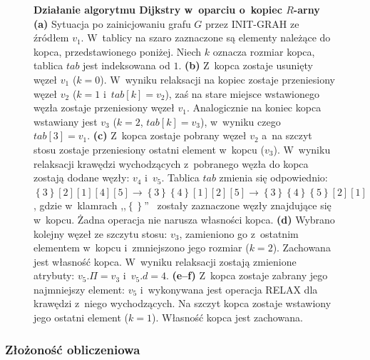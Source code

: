 \begin{figure}[!htbp]
\begin{subfigure}[b]{0.33\textwidth}
		\caption{}
	\end{subfigure}
	\caption{\textbf{Działanie algorytmu Dijkstry w~oparciu o~kopiec $R$-arny} \textbf{(a)} Sytuacja po zainicjowaniu grafu $G$ przez \textsf{INIT-GRAH} ze źródłem $v_{1}$. W~tablicy na szaro zaznaczone są elementy należące do kopca, przedstawionego poniżej. Niech $k$ oznacza rozmiar kopca, tablica $tab$ jest indeksowana od $1$. \textbf{(b)} Z~kopca zostaje usunięty węzeł $v_{1}$ ($k=0$). W~wyniku relaksacji na kopiec zostaje przeniesiony węzeł $v_{2}$ ($k=1$ i~$tab \left[ k \right] = v_{2}$), zaś na stare miejsce wstawionego węzła zostaje przeniesiony węzeł $v_{1}$. Analogicznie na koniec kopca wstawiany jest $v_{3}$  ($k=2$, $tab \left[ k \right] = v_{3}$), w~wyniku czego $tab \left[ 3 \right] = v_{1}$. \textbf{(c)} Z~kopca zostaje pobrany węzeł $v_{2}$ a~na szczyt stosu zostaje przeniesiony ostatni element w~kopcu ($v_{3}$). W~wyniku relaksacji krawędzi wychodzących z~pobranego węzła do kopca zostają dodane węzły: $v_{4}$ i~$v_{5}$. Tablica $tab$ zmienia się odpowiednio: $\left\{ 3 \right\} \left[ 2 \right]  \left[ 1 \right]  \left[ 4 \right]  \left[ 5 \right] \rightarrow \left\{ 3 \right\} \left\{ 4 \right\}  \left[ 1 \right]  \left[ 2 \right]  \left[ 5 \right] \rightarrow \left\{ 3 \right\} \left\{ 4 \right\}  \left\{ 5 \right\}  \left[ 2 \right]  \left[ 1 \right]$, gdzie w~klamrach ,,$\left\{\right\}$''~ zostały zaznaczone węzły znajdujące się w~kopcu. Żadna operacja nie narusza własności kopca. \textbf{(d)} Wybrano kolejny węzeł ze szczytu stosu: $v_{3}$, zamieniono go z~ostatnim elementem w~kopcu i~zmniejszono jego rozmiar ($k=2$). Zachowana jest własność kopca. W~wyniku relaksacji zostają zmienione atrybuty: $v_{5}.\Pi = v_{3}$ i~$v_{5}.d = 4$. \textbf{(e--f)} Z~kopca zostaje zabrany jego najmniejszy element: $v_{5}$ i~wykonywana jest operacja \textsf{RELAX} dla krawędzi z~niego wychodzących. Na szczyt kopca zostaje wstawiony jego ostatni element ($k=1$). Własność kopca jest zachowana.} \label{fig:exampleDHeap}
\end{figure}

\subsubsection{Złożoność obliczeniowa}


